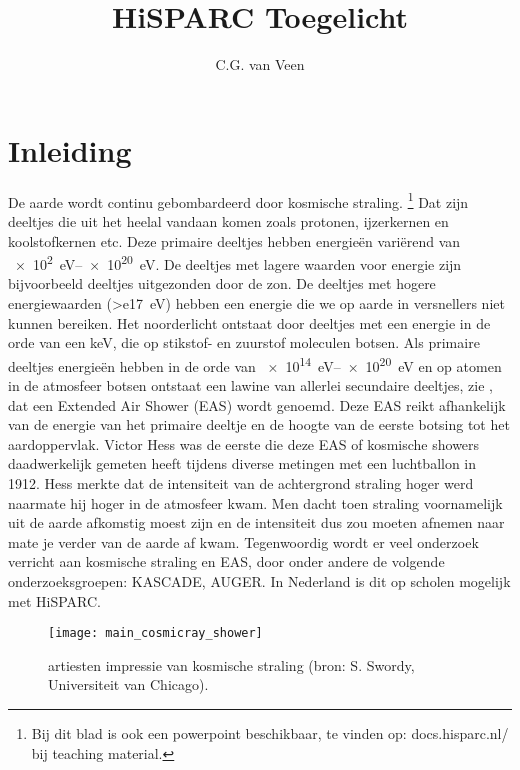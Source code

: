 

\title{HiSPARC Toegelicht} 
\author{C.G. van Veen}



\maketitle

\section{Inleiding}

De aarde wordt continu gebombardeerd door kosmische straling.
\footnote{Bij dit blad is ook een powerpoint beschikbaar, te vinden op: 
docs.hisparc.nl/ bij teaching material.}  
Dat zijn deeltjes die uit het heelal vandaan komen zoals protonen, ijzerkernen en
koolstofkernen etc. Deze primaire deeltjes hebben energieën variërend
van \SIrange{e2}{e20}{\electronvolt}. De deeltjes met lagere
waarden voor energie zijn bijvoorbeeld deeltjes uitgezonden door de zon.
De deeltjes met hogere energiewaarden (\SI{>e17}{\electronvolt}) hebben
een energie die we op aarde in versnellers niet kunnen bereiken. Het
noorderlicht ontstaat door deeltjes met een energie in de orde van een
keV, die op stikstof- en zuurstof moleculen botsen. Als primaire
deeltjes energieën hebben in de orde van \SIrange{e14}{e20}
{\electronvolt} en op atomen in de atmosfeer botsen ontstaat een lawine
van allerlei secundaire deeltjes, zie , dat
een Extended Air Shower (EAS) wordt genoemd. Deze EAS reikt afhankelijk
van de energie van het primaire deeltje en de hoogte van de eerste
botsing tot het aardoppervlak. Victor Hess was de eerste die deze EAS of
kosmische showers daadwerkelijk gemeten heeft tijdens diverse metingen
met een luchtballon in 1912. Hess merkte dat de intensiteit van de
achtergrond straling hoger werd naarmate hij hoger in de atmosfeer kwam.
Men dacht toen straling voornamelijk uit de aarde afkomstig moest zijn
en de intensiteit dus zou moeten afnemen naar mate je verder van de
aarde af kwam. Tegenwoordig wordt er veel onderzoek verricht aan
kosmische straling en EAS, door onder andere de volgende
onderzoeksgroepen: KASCADE, AUGER. In Nederland is dit op scholen
mogelijk met HiSPARC.

\begin{figure} 
\centering
\texttt{[image: main\_cosmicray\_shower]} 
\caption{artiesten
impressie van kosmische straling (bron: S. Swordy, Universiteit van
Chicago).} 
\label{fig:main_cosmicray_shower} 
\end{figure}

